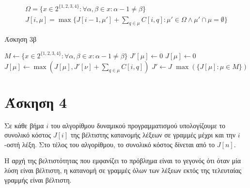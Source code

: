 \documentclass[11pt,a4paper]{book}
\begin{document}
\begin{align*}
	\Omega = \{ x \in 2^{\{1, 2, 3, 4\}}: \forall \alpha, \beta \in x: \alpha - 1 \neq \beta \}\\
	J[ i, \mu ] = \max\{J[ i - 1, \mu' ] + \sum_{q \in \mu}{C[ i, q ]}: \mu' \in \Omega \land \mu' \cap \mu = \emptyset\}
\end{align*}



\begin{algorithm}[H]
\caption{\textgreek{Άσκηση 3β}}
\begin{algorithmic}[1]
	\State $M \gets \{ x \in 2^{\{1, 2, 3, 4\}}: \forall \alpha, \beta \in x: \alpha - 1 \neq \beta \}$
		\State $J'[ \mu ] \gets 0$
	\EndFor
			\State $J[ \mu ] \gets 0$
				\If {$\nu \cap \mu = \emptyset$}
					\State $J[ \mu ] \gets \max( J[ \mu ], J'[ \nu ] + \sum_{q \in \mu}{C[ i, q ]} )$
				\EndIf
			\EndFor
		\EndFor
		\State $J' \gets J$
	\EndFor
	\State \Return $\max( \{ J[ \mu ]: \mu \in M \} )$
\EndProcedure
\end{algorithmic}
\end{algorithm}

\section*{Άσκηση 4}
Σε κάθε βήμα $i$ του αλγορίθμου δυναμικού προγραμματισμού υπολογίζουμε το συνολικό κόστος $J[ i ]$ της βέλτιστης κατανομής λέξεων σε γραμμές μέχρι και την $i$-οστή λέξη. Στο τέλος του αλγορίθμου, το συνολικό κόστος δίνεται από το $J[ n ]$.

Η αρχή της βελτιστότητας που εμφανίζει το πρόβλημα είναι το γεγονός ότι όταν μία λύση είναι βέλτιστη, η κατανομή σε γραμμές όλων των λέξεων εκτός της τελευταίας γραμμής είναι βέλτιστη.
\end{document}
